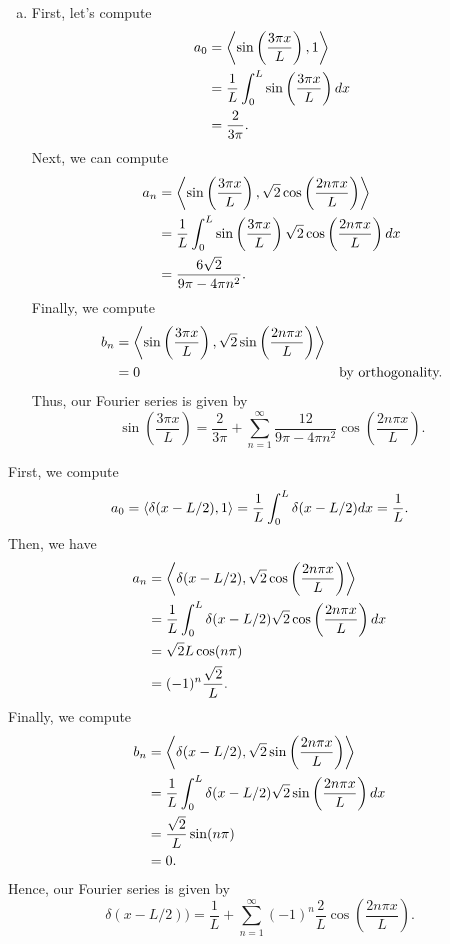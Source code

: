 \documentclass[12pt]{article} %
\begin{document}
\begin{solution}
\begin{enumerate}[(a)]
		\item First, let's compute 
		\begin{align*}
			a_0 &= \left\langle \sin\left(\frac{3 \pi x}{L}\right), 1 \right\rangle\\
				&= \frac{1}{L} \int_0^L \sin\left(\frac{3\pi x}{L}\right)dx\\
				&= \frac{2}{3\pi}.
		\end{align*}
		Next, we can compute
		\begin{align*}
					a_n &= \left\langle \sin\left(\frac{3\pi x}{L}\right), \sqrt{2}\cos\left(\frac{2 n \pi x}{L}\right) \right\rangle\\
						&= \frac{1}{L} \int_0^L \sin\left(\frac{3\pi x}{L}\right) \sqrt{2}\cos\left(\frac{2 n \pi x}{L}\right)dx\\
						&=\frac{6 \sqrt{2}}{9\pi-4\pi n^{2}}.
				\end{align*}
		Finally, we compute
		\begin{align*}
			b_n &= \left\langle \sin\left(\frac{3\pi x}{L}\right), \sqrt{2}\sin\left(\frac{2 n \pi x}{L}\right) \right\rangle\\
			&= 0 & \textrm{by orthogonality.}
		\end{align*}	
		Thus, our Fourier series is given by
		\[
			\boxed{\sin\left(\frac{3\pi x}{L}\right) = \frac{2}{3\pi} + \sum_{n=1}^\infty \frac{12}{9\pi - 4\pi n^2} \cos\left(\frac{2n\pi x}{L}\right).}
		\]
		\end{enumerate}
		\item First, we compute
		\[
		a_0 = \left\langle \delta(x-L/2), 1 \right\rangle = \frac{1}{L} \int_0^L \delta(x-L/2) dx = \frac{1}{L}.
		\]
		Then, we have
		\begin{align*}
		a_n &= \left\langle \delta(x-L/2), \sqrt{2}\cos\left(\frac{2n\pi x}{L}\right) \right\rangle\\
		& = \frac{1}{L} \int_0^L \delta(x-L/2) \sqrt{2}\cos\left(\frac{2n \pi x}{L}\right)dx\\
		&= \sqrt{2}{L} \cos(n\pi)\\
		&= (-1)^n \frac{\sqrt{2}}{L}.
		\end{align*}
		Finally, we compute
		\begin{align*}
			b_n &= \left\langle \delta(x-L/2), \sqrt{2}\sin\left(\frac{2n\pi x}{L}\right) \right\rangle\\
			&= \frac{1}{L} \int_0^L \delta(x-L/2)\sqrt{2}\sin\left(\frac{2n \pi x}{L}\right)dx\\
			&= \frac{\sqrt{2}}{L} \sin(n\pi)\\
			&= 0.
		\end{align*}
		Hence, our Fourier series is given by
		\[
		\boxed{\delta(x-L/2)) = \frac{1}{L} + \sum_{n=1}^\infty (-1)^n \frac{2}{L} \cos\left(\frac{2n\pi x}{L}\right).}
		\]
\end{solution}
\end{document}
